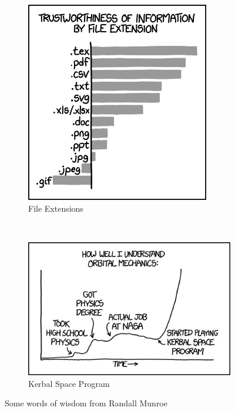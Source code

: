 \begin{figure}[htbp] 
    \centering 
    \begin{subfigure}[htbp]{0.4\textwidth} 
        \includegraphics[width=\textwidth]{figures/file_extensions.png} 
        \caption{File Extensions} \label{fig:ext} 
    \end{subfigure}~ %
    \begin{subfigure}[htbp]{0.5\textwidth} 
        \includegraphics[width=\textwidth]{figures/orbital_mechanics.png} 
        \caption{Kerbal Space Program} \label{fig:ksp} 
    \end{subfigure}
    \caption[XKCD]{Some words of wisdom from Randall Munroe}
    \label{fig:xkcd} 
\end{figure}


